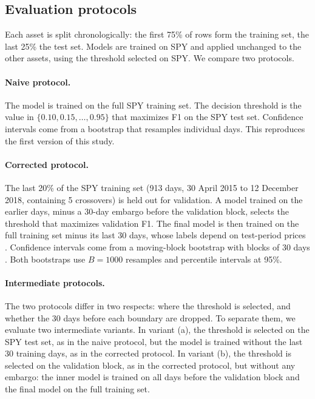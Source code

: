 \documentclass[11pt,a4paper]{article}
\begin{document}
\subsection{Evaluation protocols}

Each asset is split chronologically: the first 75\% of rows form the training set, the last 25\%
the test set. Models are trained on SPY and applied unchanged to the other assets, using the
threshold selected on SPY. We compare two protocols.

\paragraph{Naive protocol.} The model is trained on the full SPY training set. The decision
threshold is the value in $\{0.10, 0.15, \dots, 0.95\}$ that maximizes F1 on the SPY test set.
Confidence intervals come from a bootstrap that resamples individual days. This reproduces the
first version of this study.

\paragraph{Corrected protocol.} The last 20\% of the SPY training set (913 days, 30 April 2015 to
12 December 2018, containing 5 crossovers) is held out for validation. A model trained on the
earlier days, minus a 30-day embargo before the validation block, selects the threshold that
maximizes validation F1. The final model is then trained on the full training set minus its last
30 days, whose labels depend on test-period prices \citep{lopezdeprado2018}. Confidence intervals
come from a moving-block bootstrap with blocks of 30 days \citep{kunsch1989}. Both bootstraps use
$B=1000$ resamples and percentile intervals at 95\%.

\paragraph{Intermediate protocols.} The two protocols differ in two respects: where the threshold
is selected, and whether the 30 days before each boundary are dropped. To separate them, we
evaluate two intermediate variants. In variant (a), the threshold is selected on the SPY test set,
as in the naive protocol, but the model is trained without the last 30 training days, as in the
corrected protocol. In variant (b), the threshold is selected on the validation block, as in the
corrected protocol, but without any embargo: the inner model is trained on all days before the
validation block and the final model on the full training set.
\end{document}
